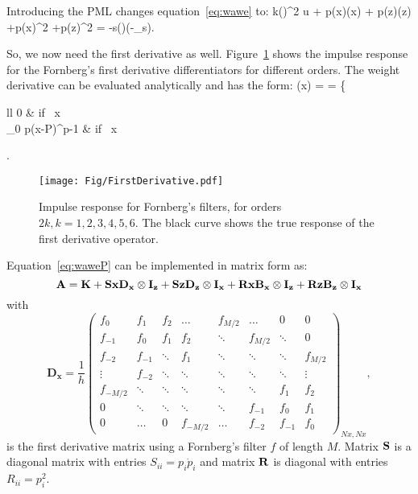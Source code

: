 \documentclass[10pt]{article}
\def\du#1#2{\frac{\partial^{#2} u}{\partial{#1}^{#2}}}
\newcommand{\twopartdef}[4]
{
 \left\{
   \begin{array}{ll}
     #1 & \mbox{if } #2 \\
     #3 & \mbox{if } #4
   \end{array}
 \right.
}
\begin{document}
Introducing the PML changes equation~\ref{eq:wawe} to:
\beq
k(\xx)^2 u + p(x)(x)\du{x}{} + p(z)(z)\du{z}{} +p(x)^2\du{x}{2} +p(z)^2\du{z}{2}  = -s(\omega)\delta(\xx-\xx_s).
  \label{eq:wawe2}
\eeq

So, we now need the first derivative as well. Figure~\ref{fig:d1} shows the impulse response for the Fornberg's first
derivative differentiators for different orders.
The weight derivative can be evaluated analytically and has the form:
\beq
{}(x) =  = \twopartdef{0}{ x \not{}}{\frac{-i}{(1+i\frac{\sigma(x)}{\omega})^2}\sigma_0 p(x-{\partial P})^{p-1}}{x\in {PML}}
\label{eq:waweP}
\eeq
 
\begin{figure}
\centering
\texttt{[image: Fig/FirstDerivative.pdf]}
\caption{Impulse response for Fornberg's filters, for orders $2k, k =1,2,3,4,5,6$. The black curve shows the true
        response of the first derivative operator.}
\label{fig:d1}
\end{figure}

Equation~\ref{eq:waweP} can be implemented in matrix form as:
\[
\bf A =\bf K + {\bf Sx} D_x \otimes \bf I_z + {\bf Sz} D_z \otimes \bf I_x +{\bf Rx} B_x \otimes \bf I_z +{\bf Rz} B_z \otimes \bf I_x
\]
with 
\begin{equation}
\mathbf{D_x}=\frac{1}{h}
 \begin{pmatrix}
  f_0     & f_1     &  f_2    & \dots   & f_{M/2} & \dots   & 0      & 0       \\
  f_{-1}  & f_0     &  f_1    & f_2     & \ddots  & f_{M/2} & \ddots & 0       \\
  f_{-2}  & f_{-1}  & \ddots  & f_1     & \ddots  &  \ddots & \ddots & f_{M/2} \\
  \vdots  & f_{-2}  & \ddots  & \ddots  & \ddots  & \ddots  & \ddots & \vdots  \\   
  f_{-M/2}& \ddots  & \ddots  & \ddots  & \ddots  & \ddots  & f_1    & f_2    \\   
  0       & \ddots  & \ddots  & \ddots  & \ddots  & f_{-1}  & f_0    & f_1    \\   
  0       & \dots   & 0       & f_{-M/2}& \dots   & f_{-2}  & f_{-1} & f_0        
 \end{pmatrix}_{Nx,Nx},
\label{eq:D}
\end{equation}
is the first derivative matrix using a Fornberg's filter $f$ of length $M$. Matrix $\bf S$ is a diagonal matrix with entries $S_{ii}= p_i\dot{p}_i$ and 
matrix $\bf R$ is diagonal with entries $ R_{ii} = p_i^2$.
\end{document}
